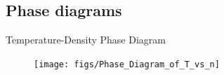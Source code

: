 \documentclass{beamer}
\renewcommand{\vec}[1]{\mathbf{#1}}
\begin{document}









\subsection*{Phase diagrams}
\begin{frame}{Temperature-Density Phase Diagram}
    \begin{figure}
        \centering
        \texttt{[image: figs/Phase\_Diagram\_of\_T\_vs\_n]}
        \label{fig:Phase_Diagram_of_T_vs_n}
    \end{figure}
\end{frame}
\end{document}
